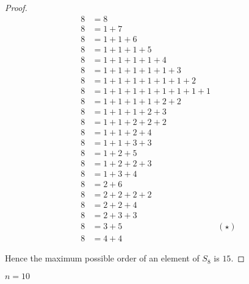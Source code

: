 \begin{proof}
    \begin{align*}
        8 & = 8                                       \\
        8 & = 1 + 7                                   \\
        8 & = 1 + 1 + 6                               \\
        8 & = 1 + 1 + 1 + 5                           \\
        8 & = 1 + 1 + 1 + 1 + 4                       \\
        8 & = 1 + 1 + 1 + 1 + 1 + 3                   \\
        8 & = 1 + 1 + 1 + 1 + 1 + 1 + 2               \\
        8 & = 1 + 1 + 1 + 1 + 1 + 1 + 1 + 1           \\
        8 & = 1 + 1 + 1 + 1 + 2 + 2                   \\
        8 & = 1 + 1 + 1 + 2 + 3                       \\
        8 & = 1 + 1 + 2 + 2 + 2                       \\
        8 & = 1 + 1 + 2 + 4                           \\
        8 & = 1 + 1 + 3 + 3                           \\
        8 & = 1 + 2 + 5                               \\
        8 & = 1 + 2 + 2 + 3                           \\
        8 & = 1 + 3 + 4                               \\
        8 & = 2 + 6                                   \\
        8 & = 2 + 2 + 2 + 2                           \\
        8 & = 2 + 2 + 4                               \\
        8 & = 2 + 3 + 3                               \\
        8 & = 3 + 5                         & (\star) \\
        8 & = 4 + 4
    \end{align*}

    Hence the maximum possible order of an element of $S_{8}$ is $15$.
\end{proof}

\newpage
\begin{exercise}
    $n = 10$
\end{exercise}

